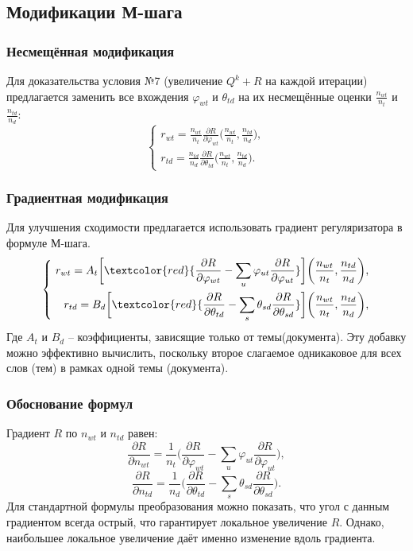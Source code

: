 \documentclass[utf8]{beamer}
\renewcommand{\phi}{\varphi}
\begin{document}
	\subsection{Модификации М-шага}
	
\begin{frame}
\frametitle{Несмещённая модификация}
Для доказательства условия №7 (увеличение $Q^k+R$ на каждой итерации) предлагается заменить все вхождения $\phi_{wt}$ и $\theta_{td}$ на их несмещённые оценки $\frac{n_{wt}}{n_t}$ и $\frac{n_{td}}{n_d}$:
\[
\left\{
	\begin{aligned}
		r_{wt} =  \frac{n_{wt}}{n_t} \frac{\partial{R}}{\partial{\phi_{wt}}} \bigg(\frac{n_{wt}}{n_t}, \frac{n_{td}}{n_d}\bigg),\\
		r_{td} = \frac{n_{td}}{n_d} \frac{\partial{R}}{\partial{\theta_{td}}} \bigg(\frac{n_{wt}}{n_t}, \frac{n_{td}}{n_d}\bigg).
	\end{aligned}
\right.
\]
\end{frame}

	
\begin{frame}
\frametitle{Градиентная модификация}
Для улучшения сходимости предлагается использовать градиент регуляризатора в формуле М-шага.
\[
\left\{\
	\begin{aligned}
		r_{wt} =  A_t \bigg[\textcolor{red} {\frac{\partial{R}}{\partial{\phi_{wt}}} - \sum\limits_u \phi_{ut} \frac{\partial{R}}{\partial{\phi_{ut}}} }\bigg] \bigg(\frac{n_{wt}}{n_t}, \frac{n_{td}}{n_d}\bigg),\\
		r_{td} =  B_d \bigg[ \textcolor{red} {\frac{\partial{R}}{\partial{\theta_{td}}} - \sum\limits_s \theta_{sd} \frac{\partial{R}}{\partial{\theta_{sd}}} }\bigg] \bigg(\frac{n_{wt}}{n_t}, \frac{n_{td}}{n_d}\bigg),
	\end{aligned}
\right.
\]
Где $A_t$ и $B_d$ -- коэффициенты, зависящие только от темы(документа). Эту добавку можно эффективно вычислить, поскольку второе слагаемое одникаковое для всех слов (тем) в рамках одной темы (документа).
\end{frame}


\begin{frame}
\frametitle{Обоснование формул}
Градиент $R$ по $n_{wt}$ и $n_{td}$ равен:
\[
\frac{\partial{R}}{\partial{n_{wt}}} = \frac{1}{n_t} \bigg(\frac{\partial{R}}{\partial{\phi_{wt}}} - \sum\limits_u \phi_{ut} \frac{\partial{R}}{\partial{\phi_{ut}}}\bigg),
\]
\[
\frac{\partial{R}}{\partial{n_{td}}} = \frac{1}{n_d} \bigg( \frac{\partial{R}}{\partial{\theta_{td}}} - \sum\limits_s \theta_{sd} \frac{\partial{R}}{\partial{\theta_{sd}}} \bigg).
\]
Для стандартной формулы преобразования можно показать, что угол с данным градиентом всегда острый, что гарантирует локальное увеличение $R$. Однако, наибольшее локальное увеличение даёт именно изменение вдоль градиента.
\end{frame}
\end{document}
